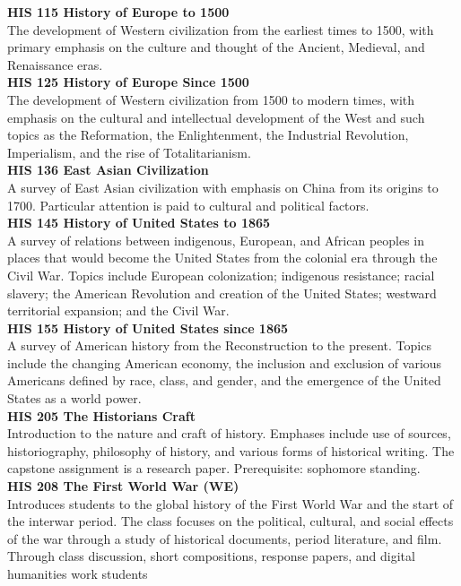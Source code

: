 \documentclass[
  letterpaper,
]{scrbook}
\begin{document}
\textbf{HIS 115 History of Europe to 1500}\\
The development of Western civilization from the earliest times to 1500,
with primary emphasis on the culture and thought of the Ancient,
Medieval, and Renaissance eras.\\
\textbf{HIS 125 History of Europe Since 1500}\\
The development of Western civilization from 1500 to modern times, with
emphasis on the cultural and intellectual development of the West and
such topics as the Reformation, the Enlightenment, the Industrial
Revolution, Imperialism, and the rise of Totalitarianism.\\
\textbf{HIS 136 East Asian Civilization}\\
A survey of East Asian civilization with emphasis on China from its
origins to 1700. Particular attention is paid to cultural and political
factors.\\
\textbf{HIS 145 History of United States to 1865}\\
A survey of relations between indigenous, European, and African peoples
in places that would become the United States from the colonial era
through the Civil War. Topics include European colonization; indigenous
resistance; racial slavery; the American Revolution and creation of the
United States; westward territorial expansion; and the Civil War.\\
\textbf{HIS 155 History of United States since 1865}\\
A survey of American history from the Reconstruction to the present.
Topics include the changing American economy, the inclusion and
exclusion of various Americans defined by race, class, and gender, and
the emergence of the United States as a world power.\\
\textbf{HIS 205 The Historians Craft}\\
Introduction to the nature and craft of history. Emphases include use of
sources, historiography, philosophy of history, and various forms of
historical writing. The capstone assignment is a research paper.
Prerequisite: sophomore standing.\\
\textbf{HIS 208 The First World War (WE)}\\
Introduces students to the global history of the First World War and the
start of the interwar period. The class focuses on the political,
cultural, and social effects of the war through a study of historical
documents, period literature, and film. Through class discussion, short
compositions, response papers, and digital humanities work students
\end{document}
